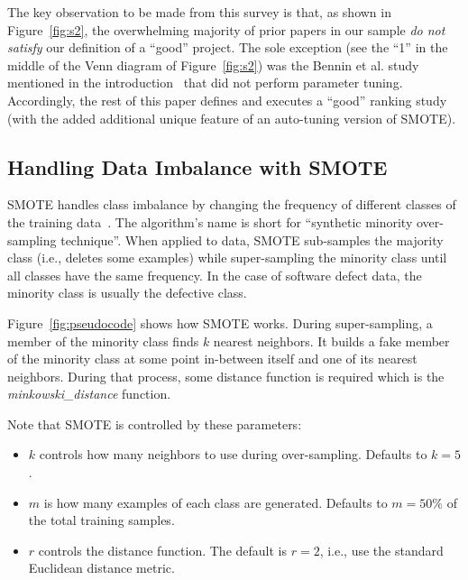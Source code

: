 \documentclass[sigconf,review, anonymous]{acmart}
\newcommand{\bi}{\begin{itemize}[leftmargin=0.4cm]}
\newcommand{\ei}{\end{itemize}}
\theoremstyle{break}
\theoremstyle{break}
\begin{document}
The key observation to be made from  this 
survey is that, as shown in Figure~\ref{fig:s2}, the overwhelming majority of
prior papers in our sample {\em do not satisfy}  our definition of a ``good'' project.
The sole exception (see the ``1'' in the middle of the Venn diagram of Figure~\ref{fig:s2})
was the Bennin et al. study  mentioned in the introduction~\cite{bennin2017mahakil}
that did not perform parameter tuning.
Accordingly, the rest of this
paper defines and executes a ``good'' ranking  study (with the added additional
unique feature of   an auto-tuning version of SMOTE).

\subsection{Handling Data Imbalance with SMOTE}
\label{sect:smote}

SMOTE handles class imbalance by changing the frequency of different classes of the training
data~\cite{chawla2002smote}. 
The algorithm's name is short for ``synthetic minority over-sampling technique''.
When applied to data, SMOTE sub-samples the majority class (i.e., deletes some examples)
while super-sampling the minority class
until
all classes have the same frequency.  In the case of software defect data,
the minority class is usually the  defective class.



Figure~\ref{fig:pseudocode} shows how SMOTE works. During super-sampling,
a member of the minority class finds $k$ nearest neighbors. It builds a fake member
of the minority class at some point in-between itself and one of its nearest
neighbors.  During that process, some distance function is required which is the {\em minkowski\_distance} function. 

\noindent
Note that SMOTE is controlled by these  parameters:
\bi
\item $k$ controls how many neighbors to use during over-sampling. Defaults to $k=5$.
\item $m$ is how many examples of each class are generated. Defaults to $m=50\%$ of the total training samples.
\item $r$ controls the distance function. The default is $r=2$,
i.e., use the  
standard Euclidean distance metric.
\ei
\end{document}
